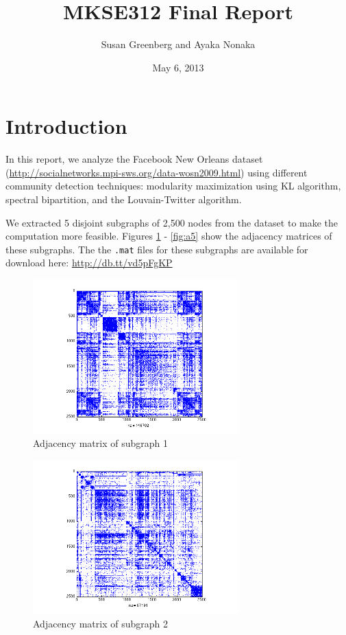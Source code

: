 \documentclass[11pt]{article}
\date{May 6, 2013}
\title{
MKSE312 Final Report
}
\author{
Susan Greenberg and Ayaka Nonaka
}
\begin{document}
\maketitle

\section{Introduction}
In this report, we analyze the Facebook New Orleans dataset (\url{http://socialnetworks.mpi-sws.org/data-wosn2009.html}) using different community detection techniques: modularity maximization using KL algorithm, spectral bipartition, and the Louvain-Twitter algorithm.

We extracted 5 disjoint subgraphs of 2,500 nodes from the dataset to make the computation more feasible. Figures \ref{fig:a1} - \ref{fig:a5} show the adjacency matrices of these subgraphs. The the \texttt{.mat} files for these subgraphs are available for download here: \url{http://db.tt/vd5pFgKP}

		 \begin{figure}
		 		\begin{center}
		  		\includegraphics[width=300px]{../graphs/a1.png}
		  	\end{center}
		  	\caption{Adjacency matrix of subgraph 1}
		  	\label{fig:a1}
		 \end{figure}

		\begin{figure}
				\begin{center}
		 		\includegraphics[width=300px]{../graphs/a2.png}
		 	\end{center}
		 	\caption{Adjacency matrix of subgraph 2}
		 	\label{fig:a2}
		\end{figure}
\end{document}
